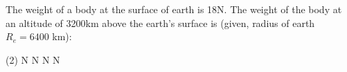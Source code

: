 \item The weight of a body at the surface of earth is 18N. The weight of the body at an altitude of 3200km above the earth’s surface is (given, radius of earth $R_e = 6400$ km):
    \begin{tasks}(2)
         N
         N
         N
         N
    \end{tasks}